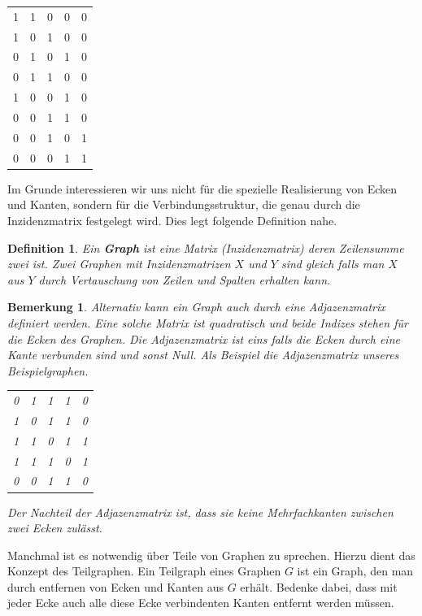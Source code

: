 \documentclass[11pt,a4paper,leqno]{report}
\newtheorem{definition}[theorem]{Definition}
\newtheorem{remark}[theorem]{Bemerkung}
\numberwithin{equation}{chapter}
\begin{document}
	\begin{center}
		\begin{tabular}{c c c c c}
			1 & 1 & 0 & 0 & 0\\
			1 & 0 & 1 & 0 & 0\\
			0 & 1 & 0 & 1 & 0\\
			0 & 1 & 1 & 0 & 0\\
			1 & 0 & 0 & 1 & 0\\
			0 & 0 & 1 & 1 & 0\\
			0 & 0 & 1 & 0 & 1\\
			0 & 0 & 0 & 1 & 1\\
		\end{tabular} 
	\end{center}
	Im Grunde interessieren wir uns nicht f\"ur die spezielle Realisierung von Ecken und Kanten, sondern f\"ur die Verbindungsstruktur, die genau durch die Inzidenzmatrix festgelegt wird. Dies legt folgende Definition nahe.
\begin{definition}
	Ein \textbf{Graph} ist eine Matrix (Inzidenzmatrix) deren Zeilensumme zwei ist. Zwei Graphen mit Inzidenzmatrizen $X$ und $Y$ sind gleich falls man $X$ aus $Y$ durch Vertauschung von Zeilen und Spalten erhalten kann.
\end{definition}
\begin{remark}
	Alternativ kann ein Graph auch durch eine Adjazenzmatrix definiert werden. Eine solche Matrix ist quadratisch und beide Indizes stehen f\"ur die Ecken des Graphen. Die Adjazenzmatrix ist eins falls die Ecken durch eine Kante verbunden sind und sonst Null. Als Beispiel die Adjazenzmatrix unseres Beispielgraphen.
	\begin{center}
	\begin{tabular}{c c c c c}
		0 & 1 & 1 & 1 & 0\\
		1 & 0 & 1 & 1 & 0\\
		1 & 1 & 0 & 1 & 1\\
		1 & 1 & 1 & 0 & 1\\
		0 & 0 & 1 & 1 & 0\\
	\end{tabular} 
\end{center}
	Der Nachteil der Adjazenzmatrix ist, dass sie keine Mehrfachkanten zwischen zwei Ecken zul\"asst.
\end{remark}
\noindent
Manchmal ist es notwendig \"uber Teile von Graphen zu sprechen. Hierzu dient das Konzept des Teilgraphen. Ein Teilgraph eines Graphen $G$ ist ein Graph, den man durch entfernen von Ecken und Kanten aus $G$ erh\"alt. Bedenke dabei, dass mit jeder Ecke auch alle diese Ecke verbindenten Kanten entfernt werden m\"ussen.
\end{document}
